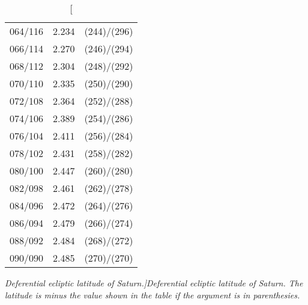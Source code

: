 \begin{table}
{\begin{tabular}{crc}
064/116 &  2.234 & (244)/(296)\\
066/114 &  2.270 & (246)/(294)\\
068/112 &  2.304 & (248)/(292)\\
070/110 &  2.335 & (250)/(290)\\
072/108 &  2.364 & (252)/(288)\\
074/106 &  2.389 & (254)/(286)\\
076/104 &  2.411 & (256)/(284)\\
078/102 &  2.431 & (258)/(282)\\
080/100 &  2.447 & (260)/(280)\\
082/098 &  2.461 & (262)/(278)\\
084/096 &  2.472 & (264)/(276)\\
086/094 &  2.479 & (266)/(274)\\
088/092 &  2.484 & (268)/(272)\\
090/090 &  2.485 & (270)/(270)\\
\end{tabular}}
\caption[\em Deferential ecliptic latitude of Saturn.]{\em Deferential ecliptic latitude of Saturn.  The latitude is minus the value shown
in the table if the argument is
in parenthesies. }\label{tlat1s}
\end{table}

